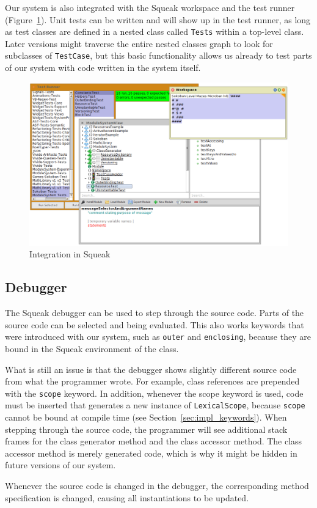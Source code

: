 Our system is also integrated with the Squeak workspace and the test runner (Figure~\ref{fig:impl_integration}). Unit tests can be written and will show up in the test runner, as long as test classes are defined in a nested class called \texttt{Tests} within a top-level class. Later versions might traverse the entire nested classes graph to look for subclasses of \texttt{TestCase}, but this basic functionality allows us already to test parts of our system with code written in the system itself.

\begin{figure}[!htp]
	\centering
	\includegraphics[width=\textwidth]{screenshot_integration.png}
	\caption{Integration in Squeak}
	\label{fig:impl_integration}
\end{figure}

\subsection{Debugger}
The Squeak debugger can be used to step through the source code. Parts of the source code can be selected and being evaluated. This also works keywords that were introduced with our system, such as \texttt{outer} and \texttt{enclosing}, because they are bound in the Squeak environment of the class.

What is still an issue is that the debugger shows slightly different source code from what the programmer wrote. For example, class references are prepended with the \texttt{scope} keyword. In addition, whenever the scope keyword is used, code must be inserted that generates a new instance of \texttt{LexicalScope}, because \texttt{scope} cannot be bound at compile time (see Section~\ref{sec:impl_keywords}). When stepping through the source code, the programmer will see additional stack frames for the class generator method and the class accessor method. The class accessor method is merely generated code, which is why it might be hidden in future versions of our system.

Whenever the source code is changed in the debugger, the corresponding method specification is changed, causing all instantiations to be updated.
